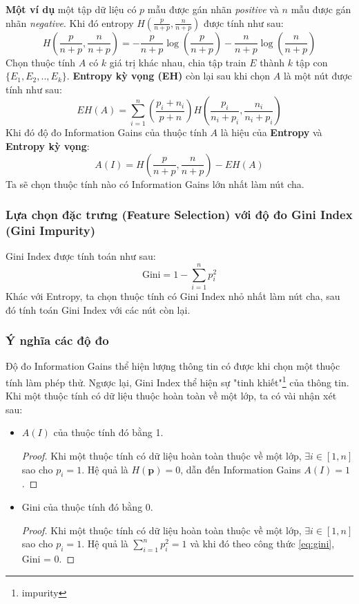 \documentclass[12pt]{article}
\begin{document}
\textbf{Một ví dụ} một tập dữ liệu có $p$ mẫu được gán nhãn \textit{positive} và $n$ mẫu được gán nhãn \textit{negative}. Khi đó entropy $H(\frac{p}{n + p}, \frac{n}{n + p})$ được tính như sau:
$$
H\left(\frac{p}{n + p}, \frac{n}{n + p}\right) = -\frac{p}{n + p}\log\left(\frac{p}{n + p}\right) - \frac{n}{n + p}\log\left(\frac{n}{n + p}\right)
$$
Chọn thuộc tính $A$ có $k$ giá trị khác nhau, chia tập train $E$ thành $k$ tập con $\{E_1, E_2, .., E_k\}$. \textbf{Entropy kỳ vọng (EH)} còn lại sau khi chọn $A$ là một nút được tính như sau:
\begin{equation}
EH(A) = \sum_{i = 1}^{n}\left(\frac{p_i + n_i}{p + n}\right)H\left(\frac{p_i}{n_i + p_i}, \frac{n_i}{n_i + p_i}\right)
\end{equation}
Khi đó độ đo Information Gains của thuộc tính $A$ là hiệu của \textbf{Entropy} và \textbf{Entropy kỳ vọng}:
\begin{equation}
A(I) = H\left(\frac{p}{n + p}, \frac{n}{n + p}\right) - EH(A)
\end{equation}
Ta sẽ chọn thuộc tính nào có Information Gains lớn nhất làm nút cha.

\subsubsection{Lựa chọn đặc trưng (Feature Selection) với độ đo Gini Index (Gini Impurity)}
Gini Index được tính toán như sau:
\begin{equation}\label{eq:gini}
\text{Gini} = 1 - \sum_{i = 1}^n p_i ^ 2
\end{equation}
Khác với Entropy, ta chọn thuộc tính có Gini Index nhỏ nhất làm nút cha, sau đó tính toán Gini Index với các nút còn lại.

\subsubsection{Ý nghĩa các độ đo}
Độ đo Information Gains thể hiện lượng thông tin có được khi chọn một thuộc tính làm phép thử. Ngược lại, Gini Index thể hiện sự "tinh khiết"\footnote{impurity} của thông tin. Khi một thuộc tính có dữ liệu thuộc hoàn toàn về một lớp, ta có vài nhận xét sau:
\begin{itemize}
\item $A(I)$ của thuộc tính đó bằng 1.
\begin{proof}
Khi một thuộc tính có dữ liệu hoàn toàn thuộc về một lớp, $\exists i \in [1, n]$ sao cho $p_i = 1$. Hệ quả là $H(\textbf{p}) = 0$, dẫn đến Information Gains $A(I) = 1$.
\end{proof}
\item Gini của thuộc tính đó bằng 0.
\begin{proof}
Khi một thuộc tính có dữ liệu hoàn toàn thuộc về một lớp, $\exists i \in [1, n]$ sao cho $p_i = 1$. Hệ quả là $\displaystyle \sum_{i = 1}^{n} p_i^2 = 1$ và khi đó theo công thức \ref{eq:gini}, Gini = 0.
\end{proof}
\end{itemize}
\end{document}
